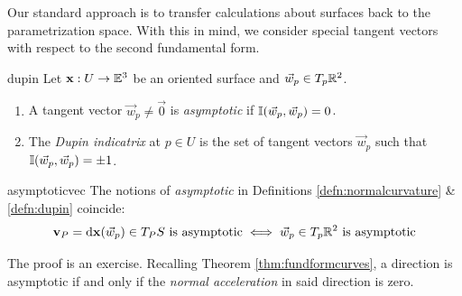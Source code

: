 
Our standard approach is to transfer calculations about surfaces back to the parametrization space. With this in mind, we consider special tangent vectors with respect to the second fundamental form.

\begin{defn}{}{dupin}
	Let ${\mathbf{x}}:U\to\mathbb{E}^3$ be an oriented surface and $\vec w_p\in T_p\mathbb{R}^2$.
	\begin{enumerate}
	  \item A tangent vector $\vec w_p\neq\vec 0$ is \emph{asymptotic} if $\mathbb{I}(\vec w_p,\vec w_p)=0$.
	  \item The \emph{Dupin indicatrix} at $p\in U$ is the set of tangent vectors $\vec w_p$ such that $\mathbb{I}(\vec w_p,\vec w_p)=\pm 1$.
	\end{enumerate}
\end{defn}

\begin{thm}{}{asymptoticvec}
	The notions of \emph{asymptotic} in Definitions \ref{defn:normalcurvature} \& \ref{defn:dupin} coincide:
	\[
		{\mathbf{v}}_P=\mathrm{d}{\mathbf{x}}(\vec w_p)\in T_PS\text{ is asymptotic}\iff \vec w_p\in T_p\mathbb{R}^2 \text{ is asymptotic}
	\]
\end{thm}

The proof is an exercise. Recalling Theorem \ref{thm:fundformcurves}, a direction is asymptotic if and only if the \emph{normal acceleration} in said direction is zero.\smallbreak

